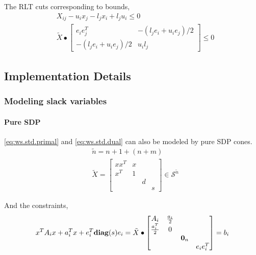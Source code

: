 \documentclass[../main]{subfiles}
\begin{document}
The RLT cuts corresponding to bounds,
\begin{align}
    \label{eq:ws.rlt.left} & X_{ij} - u_i x_j - l_j x_i + l_j u_i \le 0        \\
    \label{eq:ws.rlt.mat}  & \tilde X \bullet \begin{bmatrix}
        e_ie_j^T                  & - (l_j e_i + u_i e_j) / 2 \\
        - (l_j e_i + u_i e_j) / 2 & u_i l_j
    \end{bmatrix} \le 0
\end{align}

\subsection{Implementation Details}
\subsubsection{Modeling slack variables}
\paragraph{Pure SDP}
\eqref{eq:ws.std.primal} and \eqref{eq:ws.std.dual} can also be modeled by pure SDP cones.
\begin{equation}
    \begin{aligned}
         & \tilde n = n + 1 + (n + m)                                       \\
         & \tilde{X} = \begin{bmatrix}
            xx^T & x &   &   \\
            x^T  & 1 &   &   \\
                 &   & d &   \\
                 &   &   & s
        \end{bmatrix}\in \mathscr S^{\tilde{n}}
    \end{aligned}
\end{equation}

And the constraints,
\begin{equation}
    x^TA_ix + a_i^Tx + e_i^T\mathbf{diag}(s)e_i = \tilde{X} \bullet    \begin{bmatrix}
        A_i             & \frac{a_i}{2} &         &          \\
        \frac{a_i^T}{2} & 0             &         &          \\
                        &               & \bm 0_n &          \\
                        &               &         & e_ie_i^T
    \end{bmatrix} = b_i
\end{equation}
\end{document}
